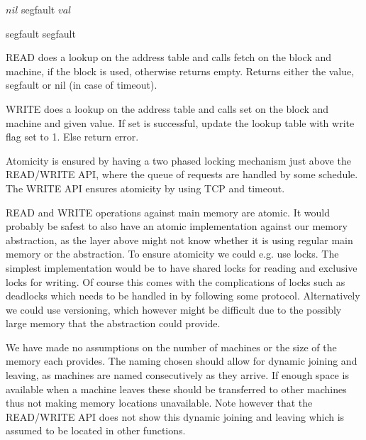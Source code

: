 \documentclass[a4paper, 11pt]{article}
\begin{document}
\begin{algorithmic}
    \State {}
    \State {}
    \State {}
        \State \Return $nil$
        \State segfault
        \State \Return $val$
    \EndIf
\EndFunction
\end{algorithmic}

\begin{algorithmic}
    \State {}
    \State {}
    \State {}
        \State segfault
        \State segfault
        \State \Return
    \EndIf
\EndFunction
\end{algorithmic}

READ does a lookup on the address table and calls fetch on the block and machine, if the block is used, otherwise returns empty. Returns either the value, segfault or nil (in case of timeout).

WRITE does a lookup on the address table and calls set on the block and machine and given value. If set is successful, update the lookup table with write flag set to 1. Else return error.

Atomicity is ensured by having a two phased locking mechanism just above the READ/WRITE API, where the queue of requests are handled by some schedule. The WRITE API ensures atomicity by using TCP and timeout.

READ and WRITE operations against main memory are atomic. It would probably be safest to also have an atomic implementation against our memory abstraction, as the layer above might not know whether it is using regular main memory or the abstraction. To ensure atomicity we could e.g. use locks. The simplest implementation would be to have shared locks for reading and exclusive locks for writing. Of course this comes with the complications of locks such as deadlocks which needs to be handled in by following some protocol. Alternatively we could use versioning, which however might be difficult due to the possibly large memory that the abstraction could provide.

We have made no assumptions on the number of machines or the size of the memory each provides. The naming chosen should allow for dynamic joining and leaving, as machines are named consecutively as they arrive. If enough space is available when a machine leaves these should be transferred to other machines thus not making memory locations unavailable. Note however that the READ/WRITE API does not show this dynamic joining and leaving which is assumed to be located in other functions.
\end{document}
